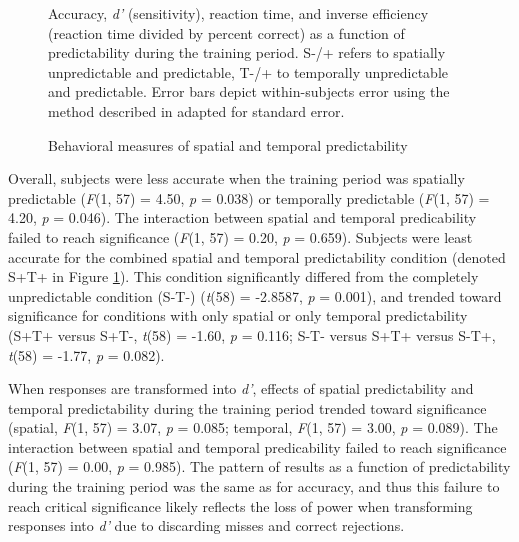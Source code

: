 \documentclass[dwyatte_dissertation.tex]{subfiles}
\begin{document}
\begin{figure}[h!]
\begin{center}
\begin{tabular}{ll}
\end{tabular}
\end{center}
\caption{Behavioral measures of spatial and temporal predictability}{Accuracy, \textit{d'} (sensitivity), reaction time, and inverse efficiency (reaction time divided by percent correct) as a function of predictability during the training period. S-/+ refers to spatially unpredictable and predictable, T-/+ to temporally unpredictable and predictable. Error bars depict within-subjects error using the method described in \protect{} adapted for standard error.}
\label{fig:bpleast_behave}
\end{figure}


Overall, subjects were less accurate when the training period was spatially predictable (\textit{F}(1, 57) = 4.50, \textit{p} = 0.038) or temporally predictable (\textit{F}(1, 57) = 4.20, \textit{p} = 0.046). The interaction between spatial and temporal predicability failed to reach significance (\textit{F}(1, 57) = 0.20, \textit{p} = 0.659). Subjects were least accurate for the combined spatial and temporal predictability condition (denoted S+T+ in Figure \ref{fig:bpleast_behave}). This condition significantly differed from the completely unpredictable condition (S-T-) (\textit{t}(58) = -2.8587, \textit{p} = 0.001), and trended toward significance for conditions with only spatial or only temporal predictability (S+T+ versus S+T-, \textit{t}(58) = -1.60, \textit{p} = 0.116; S-T- versus S+T+ versus S-T+, \textit{t}(58) = -1.77, \textit{p} = 0.082).


When responses are transformed into \textit{d'}, effects of spatial predictability and temporal predictability during the training period trended toward significance (spatial, \textit{F}(1, 57) = 3.07, \textit{p} = 0.085; temporal, \textit{F}(1, 57) = 3.00, \textit{p} = 0.089). The interaction between spatial and temporal predicability failed to reach significance (\textit{F}(1, 57) = 0.00, \textit{p} = 0.985). The pattern of results as a function of predictability during the training period was the same as for accuracy, and thus this failure to reach critical significance likely reflects the loss of power when transforming responses into \textit{d'} due to discarding misses and correct rejections. 
\end{document}
